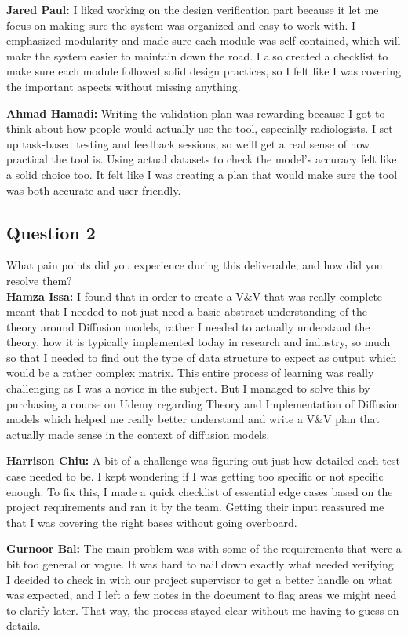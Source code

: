 \documentclass[12pt, titlepage]{article}
\begin{document}
\textbf{Jared Paul:} I liked working on the design verification part because it let me focus on making sure the system was organized and easy to work with. I emphasized modularity and made sure each module was self-contained, which will make the system easier to maintain down the road. I also created a checklist to make sure each module followed solid design practices, so I felt like I was covering the important aspects without missing anything.

\textbf{Ahmad Hamadi:} Writing the validation plan was rewarding because I got to think about how people would actually use the tool, especially radiologists. I set up task-based testing and feedback sessions, so we'll get a real sense of how practical the tool is. Using actual datasets to check the model's accuracy felt like a solid choice too. It felt like I was creating a plan that would make sure the tool was both accurate and user-friendly.

\subsection{Question 2}
What pain points did you experience during this deliverable, and how did you resolve them? \\

\textbf{Hamza Issa:} I found that in order to create a V\&V that was really complete meant that I needed to not just need a basic abstract understanding of the theory around Diffusion models, rather I needed to actually understand the theory, how it is typically implemented today in research and industry, so much so that I needed to find out the type of data structure to expect as output which would be a rather complex matrix. This entire process of learning was really challenging as I was a novice in the subject. But I managed to solve this by purchasing a course on Udemy regarding Theory and Implementation of Diffusion models which helped me really better understand and write a V\&V plan that actually made sense in the context of diffusion models.

\textbf{Harrison Chiu:} A bit of a challenge was figuring out just how detailed each test case needed to be. I kept wondering if I was getting too specific or not specific enough. To fix this, I made a quick checklist of essential edge cases based on the project requirements and ran it by the team. Getting their input reassured me that I was covering the right bases without going overboard.

\textbf{Gurnoor Bal:} The main problem was with some of the requirements that were a bit too general or vague. It was hard to nail down exactly what needed verifying. I decided to check in with our project supervisor to get a better handle on what was expected, and I left a few notes in the document to flag areas we might need to clarify later. That way, the process stayed clear without me having to guess on details.
\end{document}
